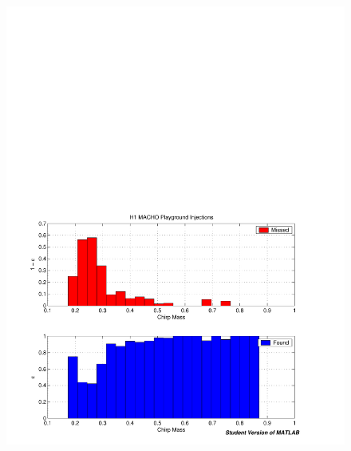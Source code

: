 \begin{figure}[p]
\begin{center}
\includegraphics[width=\textwidth]{analysis/figures/mchirp_eff} \\

\end{center}
\end{figure}
